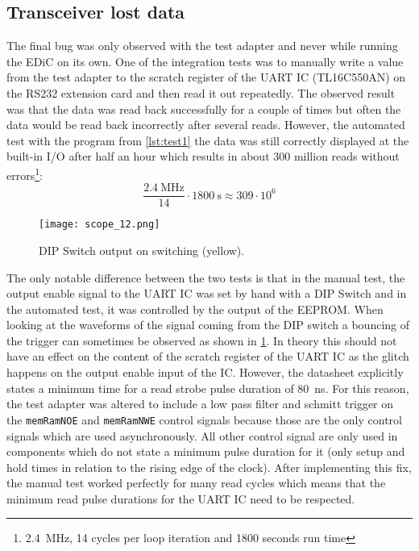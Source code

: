 \subsection{ Transceiver lost data}
The final bug was only observed with the test adapter and never while running the \gls{EDiC} on its own.
One of the integration tests was to manually write a value from the test adapter to the scratch register of the \gls{UART} \gls{IC} (TL16C550AN) on the RS232 extension card and then read it out repeatedly.
The observed result was that the data was read back successfully for a couple of times but often the data would be read back incorrectly after several reads.
However, the automated test with the program from \cref{lst:test1} the data was still correctly displayed at the built-in I/O after half an hour which results in about 300 million reads without errors\footnote{\qty{2.4}{\mega\hertz}, 14 cycles per loop iteration and 1800 seconds run time}:
\begin{equation}
  \frac{\qty{2.4}{\mega\hertz}}{14}\cdot\qty{1800}{\second}\approx 309\cdot 10^6
\end{equation}

\begin{figure}[t]
  \texttt{[image: scope\_12.png]}
  \caption{DIP Switch output on switching (yellow).}
  \label{fig:bounce}
\end{figure}
The only notable difference between the two tests is that in the manual test, the output enable signal to the \gls{UART} \gls{IC} was set by hand with a DIP Switch and in the automated test, it was controlled by the output of the \gls{EEPROM}.
When looking at the waveforms of the signal coming from the DIP switch a bouncing of the trigger can sometimes be observed as shown in \cref{fig:bounce}.
In theory this should not have an effect on the content of the scratch register of the \gls{UART} \gls{IC} as the glitch happens on the output enable input of the \gls{IC}.
However, the datasheet explicitly states a minimum time for a read strobe pulse duration of \qty{80}{\nano\second}.
For this reason, the test adapter was altered to include a low pass filter and schmitt trigger on the \texttt{memRamNOE} and \texttt{memRamNWE} control signals because those are the only control signals which are used asynchronously.
All other control signal are only used in components which do not state a minimum pulse duration for it (only setup and hold times in relation to the rising edge of the clock).
After implementing this fix, the manual test worked perfectly for many read cycles which means that the minimum read pulse durations for the \gls{UART} \gls{IC} need to be respected.

